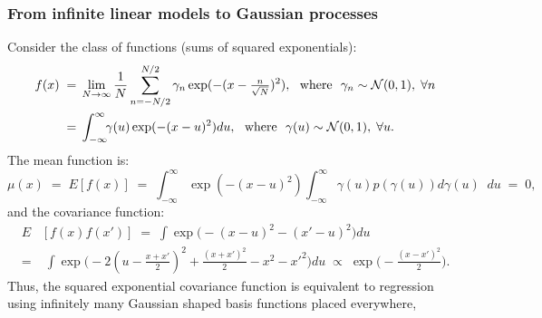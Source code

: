 \begin{frame}
\frametitle{From infinite linear models to Gaussian processes}

Consider the class of functions (sums of squared exponentials):
\[
\begin{split}
f(x)\;=&\;\lim_{N\rightarrow\infty}\frac{1}{N}\sum_{n=-N/2}^{N/2}\gamma_n\exp(-(x-\tfrac{n}{\sqrt{N}})^2),
\text{\ \ where\ \ }\gamma_n\sim{\cal N}
(0, 1),\;\forall n\\
=&\;\int_{-\infty}^\infty\!\! \gamma(u)\exp(-(x-u)^2)du,
\text{\ \ where\ \ }\gamma(u)\sim{\cal N}(0,1),\;\forall u.
\end{split}
\]
The mean function is:
\[
\mu(x)\;=\;E[f(x)]\;=\;\int_{-\infty}^\infty\exp(-(x-u)^2)
\int_{-\infty}^\infty\!\!\gamma(u) p(\gamma(u))d\gamma(u) \; \; du\;=\;0,
\]
and the covariance function:
\[
\begin{split}
E&[f(x)f(x')]\;=\;\int\exp\big(\!-(x-u)^2-(x'-u)^2\big)du\\
=&\;\int\exp\big(\!-2(u-\frac{x+x'}{2})^2+\frac{(x+x')^2}{2}-x^2-x'^2\big)du
\;\propto\;\exp\big(\!-\frac{(x-x')^2}{2}\big).
\end{split}
\]
Thus, the squared exponential covariance function is equivalent to regression
using infinitely many Gaussian shaped basis functions placed everywhere,
\end{frame}


